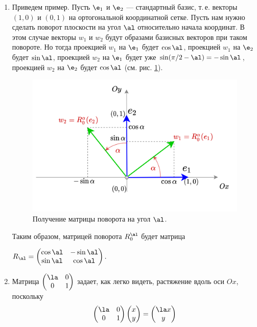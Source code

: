 \begin{enumerate}
\item Приведем пример. Пусть $\e_1$ и $\e_2$ --- стандартный базис, т.\,е. векторы $(1,0)$ и $(0,1)$ на ортогональной координатной сетке. Пусть нам нужно сделать поворот плоскости на угол $\al$ относительно начала координат. В этом случае векторы $w_1$ и $w_2$ будут образами базисных векторов при таком повороте. Но тогда проекцией $w_1$ на $\e_1$ будет $\cos\al$, проекцией $w_1$ на $\e_2$ будет $\sin\al$, проекцией $w_2$ на $\e_1$ будет уже $\sin(\pi/2-\al)=-\sin\al$, проекцией $w_2$ на $\e_2$ будет $\cos\al$ (см. рис. \ref{RotMatrix}).
\begin{figure}[hbt!]
\begin{center}
\includegraphics[scale=0.17]{RotMatrix.png}
\end{center}\caption{Получение матрицы поворота на угол $\al$.}\label{RotMatrix}
\end{figure}

Таким образом, матрицей поворота $R_0^\al$ будет матрица

\centerline{$\displaystyle
R_\al = \begin{pmatrix}
\cos\al & -\sin\al \\ \sin\al & \cos\al
\end{pmatrix}.$}

\item Матрица $\displaystyle
\begin{pmatrix}
\la & 0 \\ 0 & 1
\end{pmatrix}
$
задает, как легко видеть, растяжение вдоль оси $Ox$, поскольку
$$
\begin{pmatrix}
\la & 0 \\ 0 & 1
\end{pmatrix}
\begin{pmatrix}
x  \\ y
\end{pmatrix} =
\begin{pmatrix}
\la x  \\ y
\end{pmatrix}
$$


\end{enumerate}
